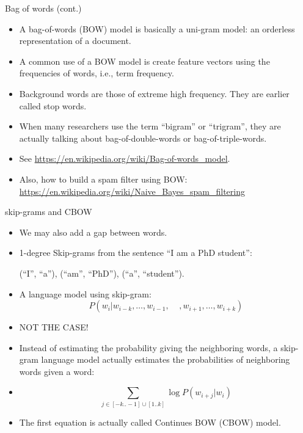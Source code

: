 \documentclass[11pt]{beamer}
\begin{document}
\begin{frame}{Bag of words (cont.)}
 \begin{itemize}[<+->]
  \item A bag-of-words (BOW) model is basically a uni-gram model: an orderless representation of a document. 
  \item A common use of a BOW model is create feature vectors using the frequencies of words, i.e., term frequency. 
  \item Background words are those of extreme high frequency. They are earlier called stop words. 
  \item When many researchers use the term ``bigram'' or ``trigram'', they are actually talking about bag-of-double-words or bag-of-triple-words. 
  \item See \url{https://en.wikipedia.org/wiki/Bag-of-words_model}.
  \item Also, how to build a spam filter using BOW: \url{https://en.wikipedia.org/wiki/Naive_Bayes_spam_filtering}
 \end{itemize}
\end{frame}

\begin{frame}{skip-grams and CBOW}
 \begin{itemize}[<+->]
  \item We may also add a gap between words. 
  \item 1-degree Skip-grams from the sentence ``I am a PhD student'':
  
  (``I'', ``a''), (``am'', ``PhD''), (``a'', ``student''). 
  \item A language model using skip-gram:  
 $$P(w_{i} | w_{i-k}, \dots, w_{i-1},~~~~~, w_{i+1}, \dots, w_{i+k})$$
  \item NOT THE CASE! 
  \item Instead of estimating the probability giving the neighboring words, a skip-gram language model actually estimates the probabilities of neighboring words given a word: 
  \item $$\sum_{j\in[-k..-1]\cup [1..k]} \log P(w_{i+j} | w_i)$$
  \item The first equation is actually called Continues BOW (CBOW) model. 
 \end{itemize}
\end{frame}
\end{document}
